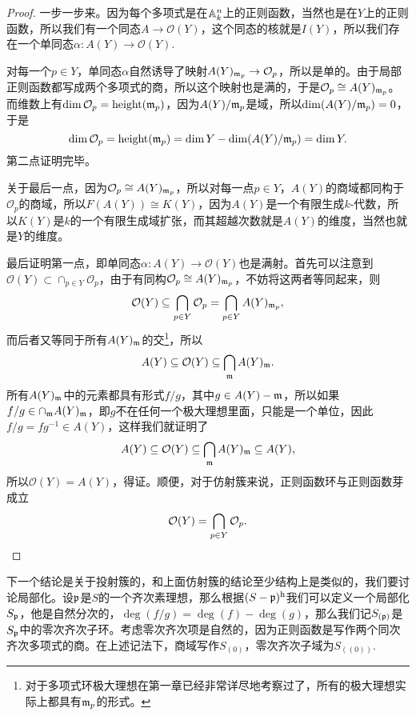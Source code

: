 \documentclass[9pt]{extbook}
\theoremstyle{plain}%
\begin{document}
\begin{proof}
	一步一步来。因为每个多项式是在$\mathbb{A}^n_k$上的正则函数，当然也是在$Y$上的正则函数，所以我们有一个同态$A\to \mathcal{O}(Y)$，这个同态的核就是$I(Y)$，所以我们存在一个单同态$\alpha: A(Y)\to\mathcal{O}(Y)$.

	对每一个$p\in Y$，单同态$\alpha$自然诱导了映射$A(Y)_{\mathfrak{m}_p}\to \mathcal{O}_p$，所以是单的。由于局部正则函数都写成两个多项式的商，所以这个映射也是满的，于是$\mathcal{O}_p\cong A(Y)_{\mathfrak{m}_p}$。而维数上有$\dim \mathcal{O}_p=\operatorname{height}(\mathfrak{m}_p)$，因为$A(Y)/\mathfrak{m}_p$是域，所以$\dim (A(Y)/\mathfrak{m}_p)=0$，于是
	\[
		\dim \mathcal{O}_p=\operatorname{height}(\mathfrak{m}_p)=\dim Y-\dim (A(Y)/\mathfrak{m}_p)=\dim Y.
	\]
	第二点证明完毕。

	关于最后一点，因为$\mathcal{O}_p\cong A(Y)_{\mathfrak{m}_p}$，所以对每一点$p\in Y$，$A(Y)$的商域都同构于$\mathcal{O}_p$的商域，所以$F(A(Y))\cong K(Y)$，因为$A(Y)$是一个有限生成$k$-代数，所以$K(Y)$是$k$的一个有限生成域扩张，而其超越次数就是$A(Y)$的维度，当然也就是$Y$的维度。

	最后证明第一点，即单同态$\alpha: A(Y)\to\mathcal{O}(Y)$也是满射。首先可以注意到$\mathcal{O}(Y)\subset \cap_{p\in Y}\mathcal{O}_p$，由于有同构$\mathcal{O}_p\cong A(Y)_{\mathfrak{m}_p}$，不妨将这两者等同起来，则
	\[
		\mathcal{O}(Y)\subseteq \bigcap_{p\in Y}\mathcal{O}_p=\bigcap_{p\in Y}A(Y)_{\mathfrak{m}_p},
	\]
	而后者又等同于所有$A(Y)_{\mathfrak{m}}$的交\footnote{对于多项式环极大理想在第一章已经非常详尽地考察过了，所有的极大理想实际上都具有$\mathfrak{m}_p$的形式。}，所以
	\[
		A(Y)\subseteq \mathcal{O}(Y)\subseteq \bigcap_{\mathfrak{m}}A(Y)_{\mathfrak{m}}.
	\]
	所有$A(Y)_{\mathfrak{m}}$中的元素都具有形式$f/g$，其中$g\in A(Y)-\mathfrak{m}$，所以如果$f/g\in \cap_{\mathfrak{m}}A(Y)_{\mathfrak{m}}$，即$g$不在任何一个极大理想里面，只能是一个单位，因此$f/g=fg^{-1}\in A(Y)$，这样我们就证明了
	\[
		A(Y)\subseteq \mathcal{O}(Y)\subseteq \bigcap_{\mathfrak{m}}A(Y)_{\mathfrak{m}}\subseteq A(Y),
	\]
	所以$\mathcal{O}(Y)=A(Y)$，得证。顺便，对于仿射簇来说，正则函数环与正则函数芽成立
	\[
		\mathcal{O}(Y)=\bigcap_{p\in Y}\mathcal{O}_{p}.
	\]
\end{proof}

下一个结论是关于投射簇的，和上面仿射簇的结论至少结构上是类似的，我们要讨论局部化。设$\mathfrak{p}$是$S$的一个齐次素理想，那么根据$(S-\mathfrak{p})^{\mathrm{h}}$我们可以定义一个局部化$S_{\mathfrak{p}}$，他是自然分次的，$\deg(f/g)=\deg (f)-\deg (g)$，那么我们记$S_{(\mathfrak{p})}$是$S_{\mathfrak{p}}$中的零次齐次子环。考虑零次齐次项是自然的，因为正则函数是写作两个同次齐次多项式的商。在上述记法下，商域写作$S_{(0)}$，零次齐次子域为$S_{((0))}$.
\end{document}

